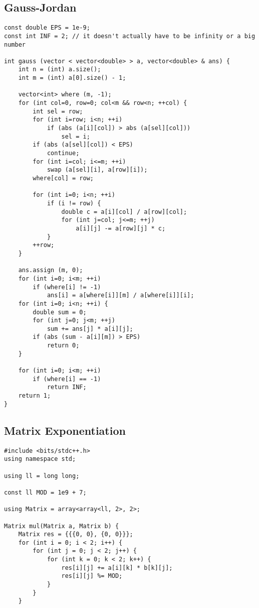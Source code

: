 \documentclass[10pt]{article}
\begin{document}
\begin{multicols*}{2}
\subsection{Gauss-Jordan}

\begin{lstlisting}[style=compactcpp]
const double EPS = 1e-9;
const int INF = 2; // it doesn't actually have to be infinity or a big number

int gauss (vector < vector<double> > a, vector<double> & ans) {
    int n = (int) a.size();
    int m = (int) a[0].size() - 1;

    vector<int> where (m, -1);
    for (int col=0, row=0; col<m && row<n; ++col) {
        int sel = row;
        for (int i=row; i<n; ++i)
            if (abs (a[i][col]) > abs (a[sel][col]))
                sel = i;
        if (abs (a[sel][col]) < EPS)
            continue;
        for (int i=col; i<=m; ++i)
            swap (a[sel][i], a[row][i]);
        where[col] = row;

        for (int i=0; i<n; ++i)
            if (i != row) {
                double c = a[i][col] / a[row][col];
                for (int j=col; j<=m; ++j)
                    a[i][j] -= a[row][j] * c;
            }
        ++row;
    }

    ans.assign (m, 0);
    for (int i=0; i<m; ++i)
        if (where[i] != -1)
            ans[i] = a[where[i]][m] / a[where[i]][i];
    for (int i=0; i<n; ++i) {
        double sum = 0;
        for (int j=0; j<m; ++j)
            sum += ans[j] * a[i][j];
        if (abs (sum - a[i][m]) > EPS)
            return 0;
    }

    for (int i=0; i<m; ++i)
        if (where[i] == -1)
            return INF;
    return 1;
}
\end{lstlisting}


\subsection{Matrix Exponentiation}
\begin{lstlisting}[style=compactcpp]
#include <bits/stdc++.h>
using namespace std;

using ll = long long;

const ll MOD = 1e9 + 7;

using Matrix = array<array<ll, 2>, 2>;

Matrix mul(Matrix a, Matrix b) {
	Matrix res = {{{0, 0}, {0, 0}}};
	for (int i = 0; i < 2; i++) {
		for (int j = 0; j < 2; j++) {
			for (int k = 0; k < 2; k++) {
				res[i][j] += a[i][k] * b[k][j];
				res[i][j] %= MOD;
			}
		}
	}


\end{lstlisting}
\end{multicols*}
\end{document}
